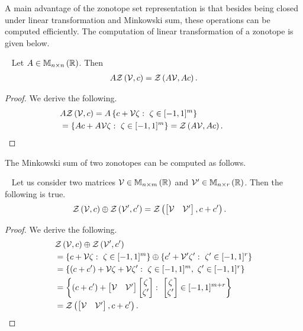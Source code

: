 A main advantage of the zonotope set representation is that besides
being closed under linear transformation and Minkowski sum, these
operations can be computed efficiently.  The computation of linear
transformation of a zonotope is given below.
%
\begin{lemma}~\label{lem:lin-rz}
Let $A\in\mathbb{M}_{n\times n}\left(\mathbb{R}\right)$.  Then
%
\begin{align*}
A\mathit{\mathcal{Z}}\left(\mathcal{V},c\right)=\mathit{\mathcal{Z}}\left(A\mathcal{V},Ac\right).
\end{align*}
%
\end{lemma} 
%
\begin{proof}
We derive the following.
%
\begin{align*}
&
  A\mathit{\mathcal{Z}}\left(\mathcal{V},c\right)=A\left\{c+\mathcal{V}\zeta:~\zeta\in[-1,1]^m\right\}\\
& = \left\{Ac+A\mathcal{V}\zeta:~\zeta\in[-1,1]^m\right\}=\mathit{\mathcal{Z}}\left(A\mathcal{V},Ac\right).\hspace{3em}\qedhere
\end{align*}
%
\end{proof}
%
The Minkowski sum of two zonotopes can be computed as follows.
%
\begin{lemma}~\label{lem:min-rz}
Let us consider two matrices $\mathcal{V}\in\mathbb{M}_{n\times m}\left(\mathbb{R}\right)$ and
$\mathcal{V}^\prime\in\mathbb{M}_{n\times r}\left(\mathbb{R}\right)$.  Then the following is true.
%
\begin{align*}
& \mathit{\mathcal{Z}}\left(\mathcal{V},c\right)\oplus\mathit{\mathcal{Z}}\left(\mathcal{V}^\prime,c^\prime\right)
= \mathit{\mathcal{Z}}\left(\left[\begin{matrix}\mathcal{V} & \mathcal{V}^\prime\end{matrix}\right],c+c^\prime\right).  
\end{align*}
%
\end{lemma}
%
\begin{proof}
We derive the following.
%
\begin{align*}
& \mathit{\mathcal{Z}}\left(\mathcal{V},c\right)\oplus\mathit{\mathcal{Z}}\left(\mathcal{V}^\prime,c^\prime\right)\\
& = \left\{c+\mathcal{V}\zeta:~\zeta\in[-1,1]^m\right\}\oplus\left\{c^\prime+\mathcal{V}^\prime\zeta^\prime:~\zeta^\prime\in[-1,1]^r\right\}\\
& =
  \left\{\left(c+c^\prime\right)+\mathcal{V}\zeta+\mathcal{V}\zeta^\prime:~\zeta\in[-1,1]^m,~\zeta^\prime\in[-1,1]^r\right\}\\
& = \left\{\left(c+c^\prime\right)+\left[\begin{matrix}\mathcal{V}
      &\mathcal{V}^\prime\end{matrix}\right]\left[\begin{matrix}\zeta\\\zeta^\prime\end{matrix}\right]:~{\left[\begin{matrix}\zeta\\\zeta^\prime\end{matrix}\right]}\in[-1,1]^{m+r}\right\}\\
& =  \mathit{\mathcal{Z}}\left(\left[\begin{matrix}\mathcal{V} & \mathcal{V}^\prime\end{matrix}\right],c+c^\prime\right).\hspace{3em}\qedhere
\end{align*}
%
\end{proof}
